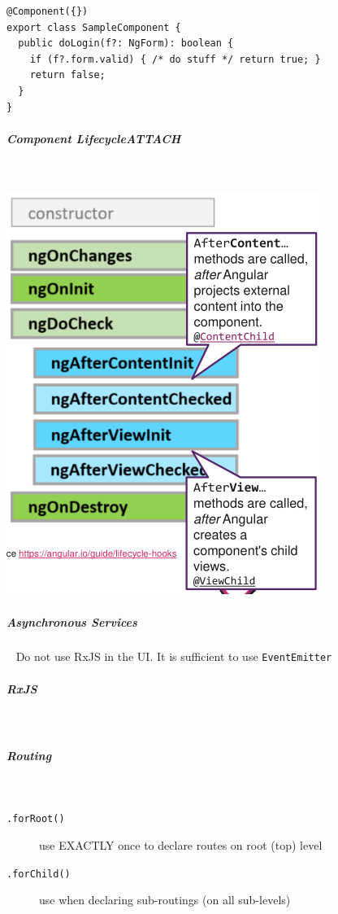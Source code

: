 \documentclass[11pt,twoside,landscape]{article}
\begin{document}
\begin{multicols}{3}
{
\begin{verbatim}
@Component({})
export class SampleComponent {
  public doLogin(f?: NgForm): boolean {
    if (f?.form.valid) { /* do stuff */ return true; }
    return false;
  }
}
\end{verbatim}
\label{lst:angular-form-logic}
}
\subparagraph{Component Lifecycle\hfill{}\textsc{ATTACH}} \
\label{sec:org0ae40bd}
{
\begin{center}
\includegraphics[width=.9\linewidth]{img/component_lifecycle.png}
\end{center}
\label{fig:component-lifecycle}
}
\subparagraph{Asynchronous Services} \
\label{sec:orgc60cf5c}
Do not use RxJS in the UI.
It is sufficient to use \texttt{EventEmitter}
\subparagraph{RxJS} \
\label{sec:org53df4c1}
\subparagraph{Routing} \
\label{sec:orgd22cf7b}
\begin{description}
\item[{\texttt{.forRoot()}}] use EXACTLY once to declare routes on root (top) level
\item[{\texttt{.forChild()}}] use when declaring sub-routings (on all sub-levels)

\end{description}
\end{multicols}
\end{document}
